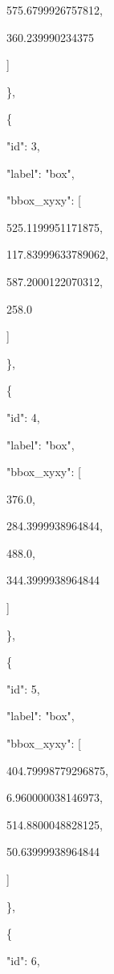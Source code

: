 \documentclass[10pt,a4paper]{article}
\begin{document}
        575.6799926757812,\allowbreak{}\par
        360.239990234375\par
      ]\par
    \},\allowbreak{}\par
    \{\par
      "id":\allowbreak{} 3,\allowbreak{}\par
      "label":\allowbreak{} "box",\allowbreak{}\par
      "bbox\_xyxy":\allowbreak{} [\par
        525.1199951171875,\allowbreak{}\par
        117.83999633789062,\allowbreak{}\par
        587.2000122070312,\allowbreak{}\par
        258.0\par
      ]\par
    \},\allowbreak{}\par
    \{\par
      "id":\allowbreak{} 4,\allowbreak{}\par
      "label":\allowbreak{} "box",\allowbreak{}\par
      "bbox\_xyxy":\allowbreak{} [\par
        376.0,\allowbreak{}\par
        284.3999938964844,\allowbreak{}\par
        488.0,\allowbreak{}\par
        344.3999938964844\par
      ]\par
    \},\allowbreak{}\par
    \{\par
      "id":\allowbreak{} 5,\allowbreak{}\par
      "label":\allowbreak{} "box",\allowbreak{}\par
      "bbox\_xyxy":\allowbreak{} [\par
        404.79998779296875,\allowbreak{}\par
        6.960000038146973,\allowbreak{}\par
        514.8800048828125,\allowbreak{}\par
        50.63999938964844\par
      ]\par
    \},\allowbreak{}\par
    \{\par
      "id":\allowbreak{} 6,\allowbreak{}\par
\end{document}
